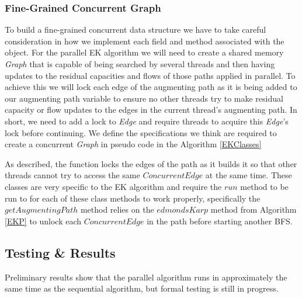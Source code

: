\subsubsection{Fine-Grained Concurrent Graph}
To build a fine-grained concurrent data structure we have to take careful consideration in how we implement each field and method associated with the object. For the parallel EK algorithm we will need to create a shared memory \textit{Graph} that is capable of being searched by several threads and then having updates to the residual capacities and flows of those paths applied in parallel. To achieve this we will lock each edge of the augmenting path as it is being added to our augmenting path variable to ensure no other threads try to make residual capacity or flow updates to the edges in the current thread's augmenting path. In short, we need to add a lock to \textit{Edge} and require threads to acquire this \textit{Edge}'s lock before continuing. We define the specifications we think are required to create a concurrent \textit{Graph} in pseudo code in the Algorithm \ref{EKClasses}

As described, the function locks the edges of the path as it builds it so that other threads cannot try to access the same $ConcurrentEdge$ at the same time. These classes are very specific to the EK algorithm and require the $run$ method to be run to for each of these class methods to work properly, specifically the $getAugmentingPath$ method relies on the $edmondsKarp$ method from Algorithm \ref{EKP} to unlock each $ConcurrentEdge$ in the path before starting another BFS.

\subsection{Testing \& Results}
Preliminary results show that the parallel algorithm runs in approximately the same time as the sequential algorithm, but formal testing is still in progress.

